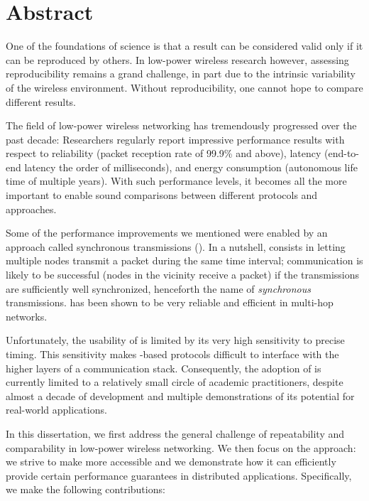 
\chapter[Abstract]{Abstract}


One of the foundations of science is that a result can be considered valid only if it can be reproduced by others.
In low-power wireless research however, assessing reproducibility remains a grand challenge, in part due to the intrinsic variability  of the wireless environment.
Without reproducibility, one cannot hope to compare different results.

The field of low-power wireless networking has tremendously progressed over the past decade:
Researchers regularly report impressive performance results with respect to reliability (packet reception rate of 99.9\% and above), latency (end-to-end latency the order of milliseconds), and energy consumption (autonomous life time of multiple years).
With such performance levels, it becomes all the more important to enable sound comparisons between different protocols and approaches.

Some of the performance improvements we mentioned were enabled by an approach called synchronous transmissions (\ST).
In a nutshell, \ST consists in letting multiple nodes transmit a packet during the same time interval; communication is likely to be successful (\ie nodes in the vicinity receive a packet) if the transmissions are sufficiently well synchronized, henceforth the name of \textit{synchronous} transmissions.
\ST has been shown to be very reliable and efficient in multi-hop networks.

Unfortunately, the usability of \ST is limited by its very high sensitivity to precise timing. This sensitivity makes \ST-based protocols difficult to interface with the higher layers of a communication stack.
Consequently, the adoption of \ST is currently limited to a relatively small circle of academic practitioners, despite almost a decade of development and multiple demonstrations of its potential for real-world applications.

In this dissertation, we first address the general challenge of repeatability and comparability in low-power wireless networking.
We then focus on the \ST approach:
we strive to make \ST more accessible and we demonstrate how it can efficiently provide certain performance guarantees in distributed applications.
Specifically, we make the following contributions:

